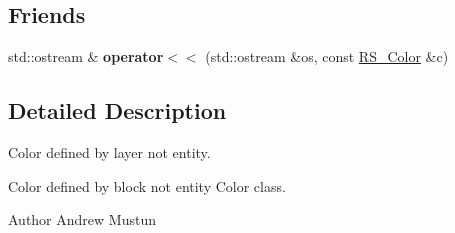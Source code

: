 \subsection*{Friends}
\begin{DoxyCompactItemize}
\item 
\hypertarget{classRS__Color_ac3c08dc2baed981d9a8316a00336b5a7}{std\-::ostream \& {\bfseries operator$<$$<$} (std\-::ostream \&os, const \hyperlink{classRS__Color}{R\-S\-\_\-\-Color} \&c)}\label{classRS__Color_ac3c08dc2baed981d9a8316a00336b5a7}

\end{DoxyCompactItemize}


\subsection{Detailed Description}
Color defined by layer not entity. 

Color defined by block not entity Color class.

\begin{DoxyAuthor}{Author}
Andrew Mustun 
\end{DoxyAuthor}



